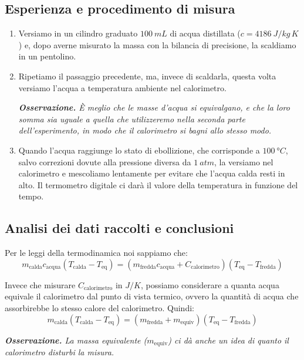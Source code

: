 \documentclass{article}
\begin{document}
\subsection{Esperienza e procedimento di misura}
    
\begin{enumerate}
    \item
        Versiamo in un cilindro graduato $\qty{100}{mL}$ di acqua distillata
        ($c=\qty{4186}{J \per kg\,K}$) e, dopo averne misurato la massa con
        la bilancia di precisione, la scaldiamo in un pentolino.
    \item
        Ripetiamo il passaggio precedente, ma, invece di scaldarla, questa volta
        versiamo l'acqua a temperatura ambiente nel calorimetro.
        
    \emph{
        \textbf{Osservazione.} È meglio che le masse d'acqua si equivalgano, e che 
        la loro somma sia uguale a quella che utilizzeremo nella seconda parte
        dell'esperimento, in modo che il calorimetro si bagni allo stesso modo.
        }
        
    \item
        Quando l'acqua raggiunge lo stato di ebollizione, che corrisponde a 
        $\qty{100}{\degree C}$, salvo correzioni dovute alla pressione diversa da
        $\qty{1}{atm}$, la versiamo nel calorimetro e mescoliamo lentamente
        per evitare che l'acqua calda resti in alto. Il termometro digitale ci
        darà il valore della temperatura in funzione del tempo.
\end{enumerate}
        
\subsection{Analisi dei dati raccolti e conclusioni}
Per le leggi della termodinamica noi sappiamo che:
    \[
        m_\text{calda} c_\text{acqua} (T_\text{calda}-T_\text{eq}) =
        (m_\text{fredda} c_\text{acqua} + C_\text{calorimetro})(T_\text{eq}-T_\text{fredda})
    \]

Invece che misurare $C_\text{calorimetro}$ in $\unit{J\per K}$, possiamo considerare a
quanta acqua equivale il calorimetro dal punto di vista termico, ovvero la quantità di
acqua che assorbirebbe lo stesso calore del calorimetro. Quindi:
    \[
        m_\text{calda} (T_\text{calda}-T_\text{eq}) =
        (m_\text{fredda} + m_\text{equiv})(T_\text{eq}-T_\text{fredda})
    \]

    \emph{
        \textbf{Osservazione.} La massa equivalente ($m_\text{equiv}$) ci dà anche un idea di
        quanto il calorimetro disturbi la misura.
        }
\end{document}

